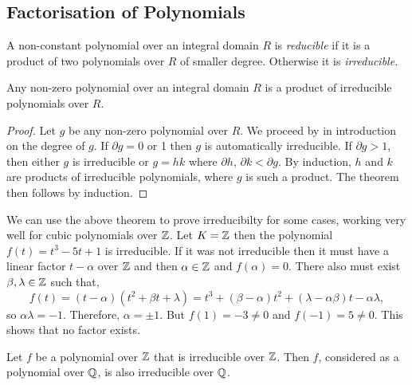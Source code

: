 




\subsection{Factorisation of Polynomials} 
\begin{definition}
     A non-constant polynomial over an integral domain $R$ is \textit{reducible} if it is a product of two polynomials over $R$ of smaller degree. Otherwise it is \textit{irreducible}.
\end{definition}

\begin{theorem}
    Any non-zero polynomial over an integral domain $R$ is a product of irreducible polynomials over $R$.
\end{theorem}

\begin{proof}
    Let $g$ be any non-zero polynomial over $R$. We proceed by in introduction on the degree of $g$. If $\partial g = 0$ or 1 then $g$ is automatically irreducible. If $\partial g > 1$, then either $g$ is irreducible or $g = hk$ where $\partial h$, $\partial k < \partial g$. By induction, $h$ and $k$ are products of irreducible polynomials, where $g$ is such a product. The theorem then follows by induction.
\end{proof}

\begin{example}
    We can use the above theorem to prove irreducibilty for some cases, working very well for cubic polynomials over $\mathbb Z$. Let $K = \mathbb Z$ then the polynomial $f(t) = t^3 -5 t + 1$ is irreducible. If it was not irreducible then it must have a linear factor $t - \alpha$ over $\mathbb Z$ and then $\alpha \in \mathbb Z$ and $f(\alpha) = 0$. There also must exist $\beta, \lambda \in \mathbb Z$ such that,
    $$
    f(t) = (t-\alpha)(t^2 + \beta t + \lambda) = t^3 + (\beta - \alpha)t^2 + (\lambda - \alpha \beta)t - \alpha \lambda,
    $$
    so $\alpha \lambda = -1$. Therefore, $\alpha = \pm 1$. But $f(1) = -3 \neq 0$ and $f(-1) = 5 \neq 0$. This shows that no factor exists.
\end{example}

\begin{lemma}
     Let $f$ be a polynomial over $\mathbb Z$ that is irreducible over $\mathbb Z$. Then $f$, considered as a polynomial over $\mathbb Q$, is also irreducible over $\mathbb Q$.
\end{lemma}


